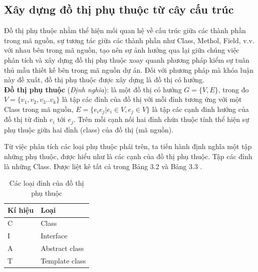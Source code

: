 \documentclass[12pt]{report}
\begin{document}
\subsection{Xây dựng đồ thị phụ thuộc từ cây cấu trúc}
Đồ thị phụ thuộc nhằm thể hiện mối quan hệ về cấu trúc giữa các thành phần trong mã nguồn, sự tương tác giữa các thành phần như Class, Methol, Field, v.v. với nhau bên trong mã nguồn, tạo nên sự ảnh hưởng qua lại giữa chúng
việc phân tích và xây dựng đồ thị phụ thuộc xoay quanh phương pháp kiểm sự tuân thủ mẫu thiết kế bên trong mã nguồn dự án.
Đối với phương pháp mà khóa luận này đề xuất, đồ thị phụ thuộc được xây dựng là đồ thị có hướng.\\
\noindent \textbf{Đồ thị phụ thuộc} (\textit{Định nghĩa}): là một đồ thị có hướng $G = \{V,E \}$, trong đo $V = \{v_1,v_2,v_3..v_k\}$ là tập các đỉnh của đồ thị với mỗi đỉnh tương ứng với một Class trong mã nguồn, $E = \{ e_ie_j | e_i \in V, e_j \in V  \}$ là tập các cạnh đinh hướng của đồ thị từ đỉnh $e_i$ tới $e_j$. Trên mỗi cạnh nối hai đỉnh chứa thuộc tính thể hiện sự phụ thuộc giữa hai đỉnh (class) của đồ thị (mã nguồn).

\noindent Từ việc phân tích các loại phụ thuộc phái trên, ta tiến hành định nghĩa một tập những phụ thuộc, được hiểu như là các cạnh của đồ thị phụ thuộc. Tập các đỉnh là những Class. Được liệt kê tất cả trong Bảng 3.2 và Bảng 3.3 \cite{orucc2016}.
\begin{table}[!htbp]
	\vspace{-0.5cm}
	\centering
	\caption{Các loại đỉnh của đồ thị phụ thuộc}
	\vspace{0.2cm}
	\label{tbl:java-class-type}
	\renewcommand{\arraystretch}{0.8}
	\begin{tabular}{|p{2.7cm}|p{8.7cm}|}
		\hline
		\textbf{Kí hiệu} & \textbf{Loại} \\ \hline
		C				& Class\\ \hline
		I				& Interface \\ \hline
		A				& Abstract class \\ \hline
		T				& Template class \\ \hline         
	\end{tabular}
\end{table}
\end{document}
